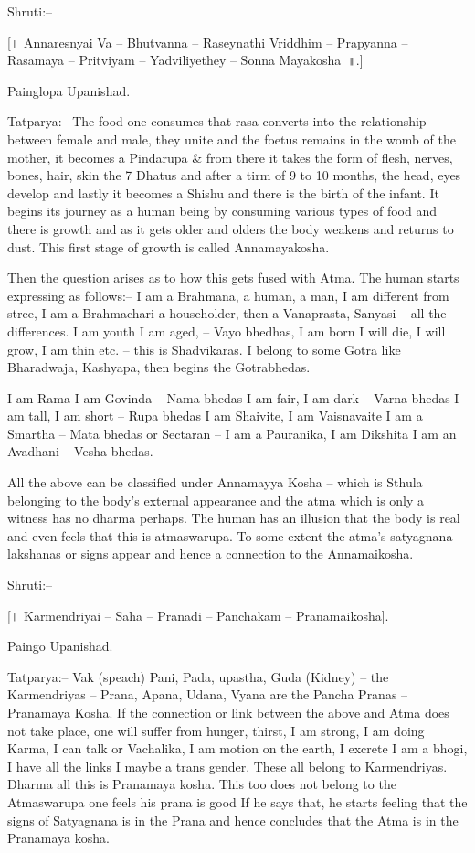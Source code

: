 Shruti:–

[॥ Annaresnyai Va – Bhutvanna – Raseynathi Vriddhim – Prapyanna – Rasamaya – Pritviyam – Yadviliyethey – Sonna Mayakosha~॥.]

Painglopa Upanishad.

Tatparya:– The food one consumes that rasa converts into the relationship between female and male, they unite and the foetus remains in the womb of the mother, it becomes a Pindarupa \& from there it takes the form of flesh, nerves, bones, hair, skin the 7 Dhatus and after a tirm of 9 to 10 months, the head, eyes develop and lastly it becomes a Shishu and there is the birth of the infant. It begins its journey as a human being by consuming various types of food and there is growth and as it gets older and olders the body weakens and returns to dust. This first stage of growth is called Annamayakosha.

Then the question arises as to how this gets fused with Atma. The human starts expressing as follows:– I am a Brahmana, a human, a man, I am different from stree, I am a Brahmachari a householder, then a Vanaprasta, Sanyasi – all the differences. I am youth I am aged, – Vayo bhedhas, I am born I will die, I will grow, I am thin etc. – this is Shadvikaras. I belong to some Gotra like Bharadwaja, Kashyapa, then begins the Gotrabhedas.

I am Rama I am Govinda – Nama bhedas I am fair, I am dark – Varna bhedas I am tall, I am short – Rupa bhedas I am Shaivite, I am Vaisnavaite I am a Smartha – Mata bhedas or Sectaran – I am a Pauranika, I am Dikshita I am an Avadhani – Vesha bhedas.

All the above can be classified under Annamayya Kosha – which is Sthula belonging to the body's external appearance and the atma which is only a witness has no dharma perhaps. The human has an illusion that the body is real and even feels that this is atmaswarupa. To some extent the atma's satyagnana lakshanas or signs appear and hence a connection to the Annamaikosha.

Shruti:–

[॥ Karmendriyai – Saha – Pranadi – Panchakam – Pranamaikosha].

Paingo Upanishad.

Tatparya:– Vak (speach) Pani, Pada, upastha, Guda (Kidney) – the Karmendriyas – Prana, Apana, Udana, Vyana are the Pancha Pranas – Pranamaya Kosha. If the connection or link between the above and Atma does not take place, one will suffer from hunger, thirst, I am strong, I am doing Karma, I can talk or Vachalika, I am motion on the earth, I excrete I am a bhogi, I have all the links I maybe a trans gender. These all belong to Karmendriyas. Dharma all this is Pranamaya kosha. This too does not belong to the Atmaswarupa one feels his prana is good If he says that, he starts feeling that the signs of Satyagnana is in the Prana and hence concludes that the Atma is in the Pranamaya kosha.

